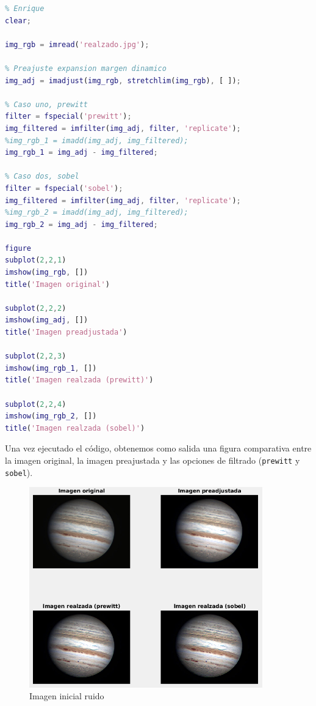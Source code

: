 \documentclass[12pt]{article}
\begin{document}
	\begin{lstlisting}[language=Matlab, caption={Implementación de filtros para el realzado en \texttt{MATLAB}}]
% 5 - Realzado
% Enrique
clear;

img_rgb = imread('realzado.jpg');

% Preajuste expansion margen dinamico
img_adj = imadjust(img_rgb, stretchlim(img_rgb), [ ]);

% Caso uno, prewitt
filter = fspecial('prewitt');
img_filtered = imfilter(img_adj, filter, 'replicate');
%img_rgb_1 = imadd(img_adj, img_filtered);
img_rgb_1 = img_adj - img_filtered;

% Caso dos, sobel
filter = fspecial('sobel');
img_filtered = imfilter(img_adj, filter, 'replicate');
%img_rgb_2 = imadd(img_adj, img_filtered);
img_rgb_2 = img_adj - img_filtered;

figure
subplot(2,2,1)
imshow(img_rgb, [])
title('Imagen original')

subplot(2,2,2)
imshow(img_adj, [])
title('Imagen preadjustada')

subplot(2,2,3)
imshow(img_rgb_1, [])
title('Imagen realzada (prewitt)')

subplot(2,2,4)
imshow(img_rgb_2, [])
title('Imagen realzada (sobel)')

	\end{lstlisting}

	\pagebreak
	
	\noindent Una vez ejecutado el código, obtenemos como salida una figura comparativa entre la imagen original, la imagen preajustada y las opciones de filtrado (\texttt{prewitt} y \texttt{sobel}).
	
	\begin{figure}[h]
		\begin{center}
			\includegraphics[width=0.9\textwidth]{img/realzado_output.png}
			\caption{Imagen inicial ruido}
			\label{img: realzado output}
		\end{center}
	\end{figure}
\end{document}
